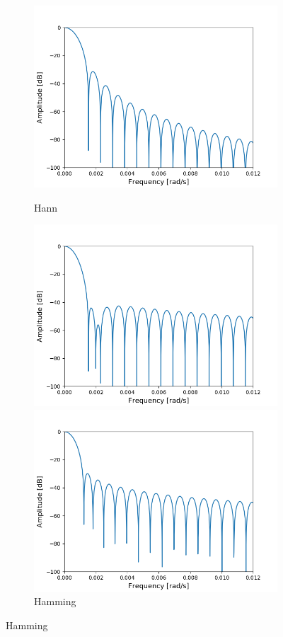 \begin{figure}[H]
\centering

\begin{subfigure}{0.49\textwidth}
\centering
\includegraphics[width=\textwidth]{figures/dbplots/stft_bilag/8192/hann.png}
\caption{Hann}
\includegraphics[width=\textwidth]{figures/dbplots/stft_bilag/8192/hamming.png}
\caption{Hamming}
\includegraphics[width=\textwidth]{figures/dbplots/stft_bilag/8192/kaiser4.png}

\end{subfigure}
\end{figure}
